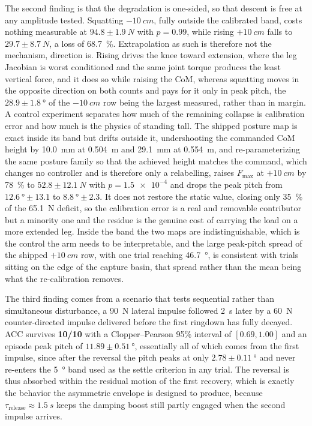 \documentclass[a4paper,fleqn]{cas-dc}
\begin{document}
The second finding is that the degradation is one-sided, so that descent is free
at any amplitude tested. Squatting ${-}\SI{10}{cm}$, fully outside the
calibrated band, costs nothing measurable at $94.8{\pm}\SI{1.9}{N}$ with
$p{=}0.99$, while rising ${+}\SI{10}{cm}$ falls to $29.7{\pm}\SI{8.7}{N}$, a
loss of \SI{68.7}{\percent}.
Extrapolation as such is therefore not the mechanism, direction is. Rising
drives the knee toward extension, where the leg Jacobian is worst conditioned
and the same joint torque produces the least vertical force, and it does so
while raising the CoM, whereas squatting moves in the opposite direction on both
counts and pays for it only in peak pitch, the $28.9{\pm}\SI{1.8}{\degree}$ of
the ${-}\SI{10}{cm}$ row being the largest measured, rather than in margin.
A control experiment separates how much of the remaining collapse is calibration
error and how much is the physics of standing tall. The shipped posture map is
exact inside its band but drifts outside it, undershooting the commanded CoM
height by \SI{10.0}{mm} at \SI{0.504}{m} and \SI{29.1}{mm} at \SI{0.554}{m}, and
re-parameterizing the same posture family so that the achieved height matches the
command, which changes no controller and is therefore only a relabelling, raises
$F_{\max}$ at ${+}\SI{10}{cm}$ by \SI{78}{\percent} to $52.8{\pm}\SI{12.1}{N}$
with $p{=}\num{1.5e-4}$ and drops the peak pitch from
$\SI{12.6}{\degree}{\pm}13.1$ to $\SI{8.8}{\degree}{\pm}2.3$. It does not restore
the static value, closing only \SI{35}{\percent} of the \SI{65.1}{N} deficit, so
the calibration error is a real and removable contributor but a minority one and
the residue is the genuine cost of carrying the load on a more extended leg.
Inside the band the two maps are indistinguishable, which is the control the arm
needs to be interpretable, and the large peak-pitch spread of the shipped
${+}\SI{10}{cm}$ row, with one trial reaching \SI{46.7}{\degree}, is consistent
with trials sitting on the edge of the capture basin, that spread rather than the
mean being what the re-calibration removes.

The third finding comes from a scenario that tests sequential rather than
simultaneous disturbance, a \SI{90}{N} lateral impulse followed \SI{2}{s} later
by a \SI{60}{N} counter-directed impulse delivered before the first ringdown has
fully decayed. ACC survives \textbf{10/10} with a Clopper--Pearson 95\% interval
of $[0.69,1.00]$ and an episode peak pitch of $11.89\pm\SI{0.51}{\degree}$,
essentially all of which comes from the first impulse, since after the reversal
the pitch peaks at only $2.78\pm\SI{0.11}{\degree}$ and never re-enters the
\SI{5}{\degree} band used as the settle criterion in any trial. The reversal is
thus absorbed within the residual motion of the first recovery, which is exactly
the behavior the asymmetric envelope is designed to produce, because
$\tau_{\text{release}}{\approx}\SI{1.5}{s}$ keeps the damping boost still partly
engaged when the second impulse arrives.
\end{document}
